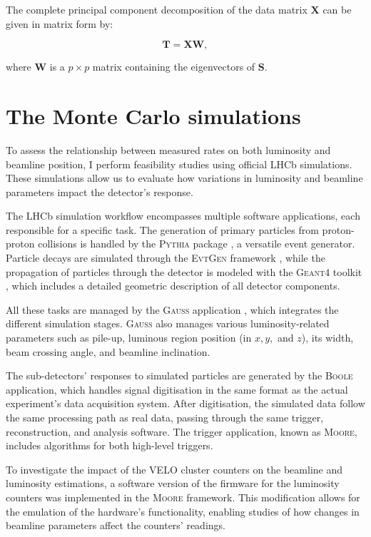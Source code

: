 The complete principal component decomposition of the data matrix $\mathbf{X}$ can be given in matrix form by:

\begin{equation}
\mathbf{T} = \mathbf{X} \mathbf{W},
\end{equation}

where $\mathbf{W}$ is a $p \times p$ matrix containing the eigenvectors of $\mathbf{S}$.



\section{The Monte Carlo simulations}
To assess the relationship between measured rates on both luminosity and beamline position, I perform feasibility studies using official LHCb simulations. These simulations allow us to evaluate how variations in luminosity and beamline parameters impact the detector's response.

The LHCb simulation workflow encompasses multiple software applications, each responsible for a specific task. The generation of primary particles from proton-proton collisions is handled by the \textsc{Pythia} package \cite{Sj_strand_2006}, a versatile event generator. Particle decays are simulated through the \textsc{EvtGen} framework \cite{Lange:2001uf}, while the propagation of particles through the detector is modeled with the \textsc{Geant4} toolkit \cite{Agostinelli:2002hh}, which includes a detailed geometric description of all detector components.

All these tasks are managed by the \textsc{Gauss} application \cite{Miglioranzi:1322402}, which integrates the different simulation stages. \textsc{Gauss} also manages various luminosity-related parameters such as pile-up, luminous region position (in \(x, y,\) and \(z\)), its width, beam crossing angle, and beamline inclination.

The sub-detectors' responses to simulated particles are generated by the \textsc{Boole} application, which handles signal digitisation in the same format as the actual experiment's data acquisition system. After digitisation, the simulated data follow the same processing path as real data, passing through the same trigger, reconstruction, and analysis software. The trigger application, known as \textsc{Moore}, includes algorithms for both high-level triggers. 

To investigate the impact of the VELO cluster counters on the beamline and luminosity estimations, a software version of the firmware for the luminosity counters was implemented in the \textsc{Moore} framework. This modification allows for the emulation of the hardware's functionality, enabling studies of how changes in beamline parameters affect the counters' readings.

